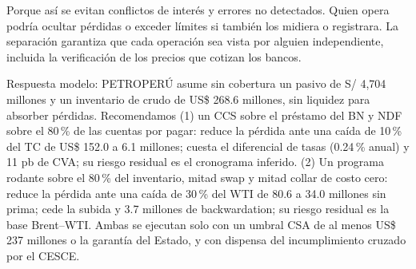  Porque así se evitan conflictos de interés y errores no detectados. Quien opera podría ocultar pérdidas o exceder límites si también los midiera o registrara. La separación garantiza que cada operación sea vista por alguien independiente, incluida la verificación de los precios que cotizan los bancos.

 Respuesta modelo: PETROPERÚ asume sin cobertura un pasivo de S/ 4,704 millones y un inventario de crudo de US\$ 268.6 millones, sin liquidez para absorber pérdidas. Recomendamos (1) un CCS sobre el préstamo del BN y NDF sobre el 80\,\% de las cuentas por pagar: reduce la pérdida ante una caída de 10\,\% del TC de US\$ 152.0 a 6.1 millones; cuesta el diferencial de tasas (0.24\,\% anual) y 11 pb de CVA; su riesgo residual es el cronograma inferido. (2) Un programa rodante sobre el 80\,\% del inventario, mitad swap y mitad collar de costo cero: reduce la pérdida ante una caída de 30\,\% del WTI de 80.6 a 34.0 millones sin prima; cede la subida y 3.7 millones de backwardation; su riesgo residual es la base Brent--WTI. Ambas se ejecutan solo con un umbral CSA de al menos US\$ 237 millones o la garantía del Estado, y con dispensa del incumplimiento cruzado por el CESCE.
